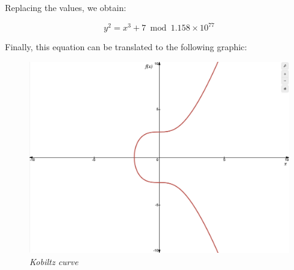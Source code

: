 \documentclass{article}
\begin{document}
Replacing the values, we obtain:

\[y^2 = x^3 + 7 \bmod{1.158 \times 10^{77}}\]

Finally, this equation can be translated to the following graphic:


\begin{figure}[H]
    \begin{center}
        \includegraphics[width=0.5 \textwidth]{images/Kobiltz_curve.png}
        \caption{\textit{Kobiltz curve}}
    \end{center}
\end{figure}

\end{document}
